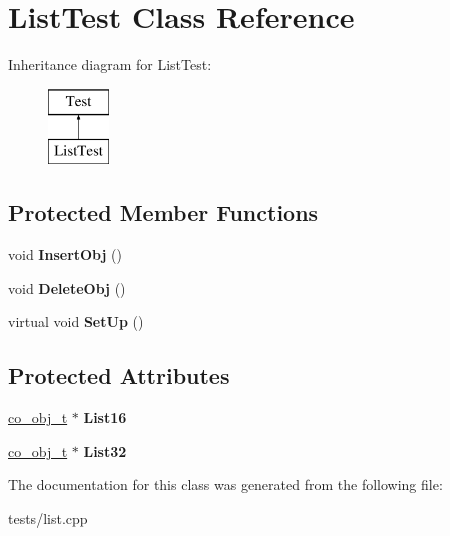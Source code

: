 \hypertarget{classListTest}{\section{List\+Test Class Reference}
\label{classListTest}
}
Inheritance diagram for List\+Test\+:\begin{figure}[H]
\begin{center}
\leavevmode
\includegraphics[height=2.000000cm]{classListTest}
\end{center}
\end{figure}
\subsection*{Protected Member Functions}
\begin{DoxyCompactItemize}
\item 
\hypertarget{classListTest_affc2f4cf21beae819fb58f55bb8a27a6}{void {\bfseries Insert\+Obj} ()}\label{classListTest_affc2f4cf21beae819fb58f55bb8a27a6}

\item 
\hypertarget{classListTest_a3f003521f77f0d69ce15c250c9b3110c}{void {\bfseries Delete\+Obj} ()}\label{classListTest_a3f003521f77f0d69ce15c250c9b3110c}

\item 
\hypertarget{classListTest_a6ce63aead1163d5e2921ade6a1416912}{virtual void {\bfseries Set\+Up} ()}\label{classListTest_a6ce63aead1163d5e2921ade6a1416912}

\end{DoxyCompactItemize}
\subsection*{Protected Attributes}
\begin{DoxyCompactItemize}
\item 
\hypertarget{classListTest_ae7f2c29aec56333f92c277820f1e1bee}{\hyperlink{structco__obj__t}{co\+\_\+obj\+\_\+t} $\ast$ {\bfseries List16}}\label{classListTest_ae7f2c29aec56333f92c277820f1e1bee}

\item 
\hypertarget{classListTest_a3710a8726b3583f7dc600cb1377331a8}{\hyperlink{structco__obj__t}{co\+\_\+obj\+\_\+t} $\ast$ {\bfseries List32}}\label{classListTest_a3710a8726b3583f7dc600cb1377331a8}

\end{DoxyCompactItemize}


The documentation for this class was generated from the following file\+:\begin{DoxyCompactItemize}
\item 
tests/list.\+cpp\end{DoxyCompactItemize}
